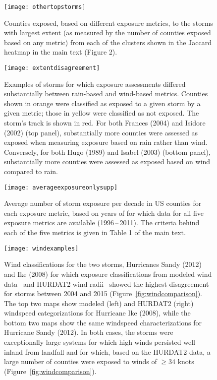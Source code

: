 \documentclass[11pt, titlepage, twoside]{article}
\begin{document}
\clearpage

\begin{figure}[tbhp!]
\centering
\texttt{[image: othertopstorms]}
\caption{Counties exposed, based on different exposure metrics, to the storms
with largest extent (as measured by the number of counties exposed based on any
metric) from each of the clusters shown in the Jaccard heatmap in the main text
(Figure 2).}
\label{fig:othertopstorms}
\end{figure}

\clearpage

\begin{figure}[tbhp!]
\centering
\texttt{[image: extentdisagreement]}
\caption{Examples of storms for which exposure assessments differed
substantially between rain-based and wind-based metrics. Counties shown in
orange were classified as exposed to a given storm by a given metric; those in
yellow were classified as not exposed. The storm's track is shown in red. For
both Frances (2004) and Isidore (2002) (top panel), substantially more counties
were assessed as exposed when measuring exposure based on rain rather than
wind. Conversely, for both Hugo (1989) and Isabel (2003) (bottom panel),
substantially more counties were assessed as exposed based on wind compared to
rain.}
\label{fig:extentdisagreement}
\end{figure}

\clearpage

\begin{figure}[tbhp!]
\centering
\texttt{[image: averageexposureonlysupp]}
\caption{Average number of storm exposure per decade in \ac{US} counties for
each exposure metric, based on years of for which data for all five exposure
metrics are available (1996\,--\,2011). The criteria behind each of the five
metrics is given in Table 1 of the main text.} \label{fig:averageexposuresupp}
\end{figure}

\clearpage 

\begin{figure}[tbhp!]
\centering
\texttt{[image: windexamples]}
\caption{Wind classifications for the two storms, Hurricanes Sandy (2012) and
Ike (2008) for which exposure classifications from modeled wind
data~\parencite{stormwindmodel} and \ac{HURDAT2} wind
radii~\parencite{demuth2006improvement} showed the highest disagreement for storms
between 2004 and 2015 (Figure~\ref{fig:windcomparison}). The top two maps show
modeled (left) and \ac{HURDAT2} (right) windspeed categorizations for Hurricane
Ike (2008), while the bottom two maps show the same windspeed characterizations
for Hurricane Sandy (2012).  In both cases, the storms were exceptionally large
systems for which high winds persisted well inland from landfall and for which,
based on the \ac{HURDAT2} data, a large number of counties were exposed to
winds of $\ge$34 knots (Figure~\ref{fig:windcomparison}).}
\label{fig:windexamples}
\end{figure}
\end{document}
